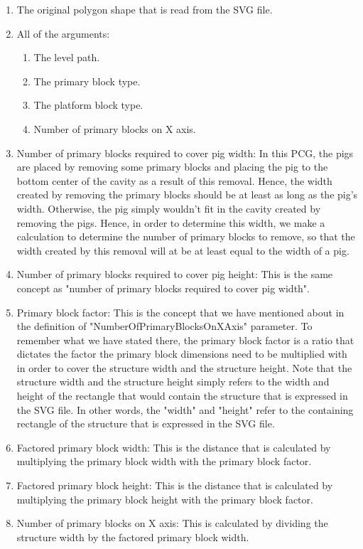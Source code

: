 \documentclass{dalthesis}
\begin{document}
\begin{enumerate}
  \begin{enumerate}
    \item The original polygon shape that is read from the SVG file.
    \item All of the arguments:
    \begin{enumerate}
      \item The level path.
      \item The primary block type.
      \item The platform block type.
      \item Number of primary blocks on X axis.
    \end{enumerate}
    \item Number of primary blocks required to cover pig width: In this PCG, the pigs are placed by removing some primary blocks and placing the pig to the bottom center of the cavity as a result of this removal. Hence, the width created by removing the primary blocks should be at least as long as the pig's width. Otherwise, the pig simply wouldn't fit in the cavity created by removing the pigs. Hence, in order to determine this width, we make a calculation to determine the number of primary blocks to remove, so that the width created by this removal will at be at least equal to the width of a pig.
    \item Number of primary blocks required to cover pig height: This is the same concept as "number of primary blocks required to cover pig width".
    \item Primary block factor: This is the concept that we have mentioned about in the definition of "NumberOfPrimaryBlocksOnXAxis" parameter. To remember what we have stated there, the primary block factor is a ratio that dictates the factor the primary block dimensions need to be multiplied with in order to cover the structure width and the structure height. Note that the structure width and the structure height simply refers to the width and height of the rectangle that would contain the structure that is expressed in the SVG file. In other words, the "width" and "height" refer to the containing rectangle of the structure that is expressed in the SVG file.
    \item Factored primary block width: This is the distance that is calculated by multiplying the primary block width with the primary block factor.
    \item Factored primary block height: This is the distance that is calculated by multiplying the primary block height with the primary block factor.
    \item Number of primary blocks on X axis: This is calculated by dividing the structure width by the factored primary block width.

\end{enumerate}
\end{enumerate}
\end{document}
